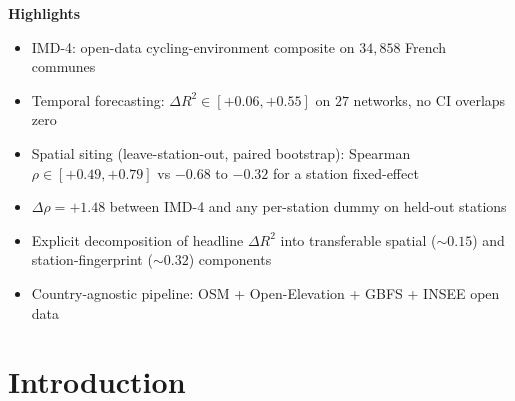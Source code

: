 \documentclass[11pt,a4paper]{article}
\newenvironment{highlights}{%
  \par\noindent\textbf{\large Highlights}\par\smallskip
  \begin{itemize}[leftmargin=1.4em,itemsep=0.15em,topsep=0.2em]}{%
  \end{itemize}\par\medskip}
\begin{document}
\begin{abstract}
Cross-referencing the two evaluations, the
$\Delta R^2 \approx +0.47$ recorded on Bluebikes Boston's
temporal hold-out is interpretively bounded by two distinct
operational components: $\sim +0.15$ of \emph{transferable
spatial information} (operationally relevant for siting,
recovered by the LSO) plus $\sim +0.32$ of \emph{parsimonious
station fingerprint} (relevant for short-term forecasting of
existing stations, recovered only by the temporal hold-out).
This separation is, to our knowledge, the first explicit
empirical articulation of the two components in the
cycling-demand literature.  Code, data,
trained models and the $183$-city worldwide IMD-4 atlas are
released under MIT.

\noindent\textbf{Keywords:}
bike-sharing ; demand forecasting ; station siting ;
composite indicator ; cycling-environment ; spatial
generalisation ; leave-station-out ; gradient boosting ;
GBFS pseudo-flow.
\end{abstract}

\begin{highlights}
\item IMD-4: open-data cycling-environment composite on $34{,}858$ French communes
\item Temporal forecasting: $\Delta R^2 \in [+0.06, +0.55]$ on $27$ networks, no CI overlaps zero
\item Spatial siting (leave-station-out, paired bootstrap): Spearman $\rho \in [+0.49, +0.79]$ vs $-0.68$ to $-0.32$ for a station fixed-effect
\item $\Delta \rho = +1.48$ between IMD-4 and any per-station dummy on held-out stations
\item Explicit decomposition of headline $\Delta R^2$ into transferable spatial ($\sim 0.15$) and station-fingerprint ($\sim 0.32$) components
\item Country-agnostic pipeline: OSM + Open-Elevation + GBFS + INSEE open data
\end{highlights}

\section{Introduction}
\label{sec:intro}
\end{document}
